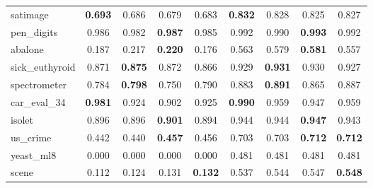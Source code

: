 \begin{figure}[ht]
\begin{tabular}{p{22mm}|*4{p{14mm}}|*4{p{14mm}}}
        satimage&\multicolumn{1}{c}{\textbf{0.693}}&\multicolumn{1}{c}{0.686}&\multicolumn{1}{c}{0.679}&\multicolumn{1}{c|}{0.683}&\multicolumn{1}{c}{\textbf{0.832}}&\multicolumn{1}{c}{0.828}&\multicolumn{1}{c}{0.825}&\multicolumn{1}{c}{0.827}\\
        pen\_digits&\multicolumn{1}{c}{0.986}&\multicolumn{1}{c}{0.982}&\multicolumn{1}{c}{\textbf{0.987}}&\multicolumn{1}{c|}{0.985}&\multicolumn{1}{c}{0.992}&\multicolumn{1}{c}{0.990}&\multicolumn{1}{c}{\textbf{0.993}}&\multicolumn{1}{c}{0.992}\\
        abalone&\multicolumn{1}{c}{0.187}&\multicolumn{1}{c}{0.217}&\multicolumn{1}{c}{\textbf{0.220}}&\multicolumn{1}{c|}{0.176}&\multicolumn{1}{c}{0.563}&\multicolumn{1}{c}{0.579}&\multicolumn{1}{c}{\textbf{0.581}}&\multicolumn{1}{c}{0.557}\\
        sick\_euthyroid&\multicolumn{1}{c}{0.871}&\multicolumn{1}{c}{\textbf{0.875}}&\multicolumn{1}{c}{0.872}&\multicolumn{1}{c|}{0.866}&\multicolumn{1}{c}{0.929}&\multicolumn{1}{c}{\textbf{0.931}}&\multicolumn{1}{c}{0.930}&\multicolumn{1}{c}{0.927}\\
        spectrometer&\multicolumn{1}{c}{0.784}&\multicolumn{1}{c}{\textbf{0.798}}&\multicolumn{1}{c}{0.750}&\multicolumn{1}{c|}{0.790}&\multicolumn{1}{c}{0.883}&\multicolumn{1}{c}{\textbf{0.891}}&\multicolumn{1}{c}{0.865}&\multicolumn{1}{c}{0.887}\\
        car\_eval\_34&\multicolumn{1}{c}{\textbf{0.981}}&\multicolumn{1}{c}{0.924}&\multicolumn{1}{c}{0.902}&\multicolumn{1}{c|}{0.925}&\multicolumn{1}{c}{\textbf{0.990}}&\multicolumn{1}{c}{0.959}&\multicolumn{1}{c}{0.947}&\multicolumn{1}{c}{0.959}\\
        isolet&\multicolumn{1}{c}{0.896}&\multicolumn{1}{c}{0.896}&\multicolumn{1}{c}{\textbf{0.901}}&\multicolumn{1}{c|}{0.894}&\multicolumn{1}{c}{0.944}&\multicolumn{1}{c}{0.944}&\multicolumn{1}{c}{\textbf{0.947}}&\multicolumn{1}{c}{0.943}\\
        us\_crime&\multicolumn{1}{c}{0.442}&\multicolumn{1}{c}{0.440}&\multicolumn{1}{c}{\textbf{0.457}}&\multicolumn{1}{c|}{0.456}&\multicolumn{1}{c}{0.703}&\multicolumn{1}{c}{0.703}&\multicolumn{1}{c}{\textbf{0.712}}&\multicolumn{1}{c}{\textbf{0.712}}\\
        yeast\_ml8&\multicolumn{1}{c}{0.000}&\multicolumn{1}{c}{0.000}&\multicolumn{1}{c}{0.000}&\multicolumn{1}{c|}{0.000}&\multicolumn{1}{c}{0.481}&\multicolumn{1}{c}{0.481}&\multicolumn{1}{c}{0.481}&\multicolumn{1}{c}{0.481}\\
        scene&\multicolumn{1}{c}{0.112}&\multicolumn{1}{c}{0.124}&\multicolumn{1}{c}{0.131}&\multicolumn{1}{c|}{\textbf{0.132}}&\multicolumn{1}{c}{0.537}&\multicolumn{1}{c}{0.544}&\multicolumn{1}{c}{0.547}&\multicolumn{1}{c}{\textbf{0.548}}\\

\end{tabular}
\end{figure}
